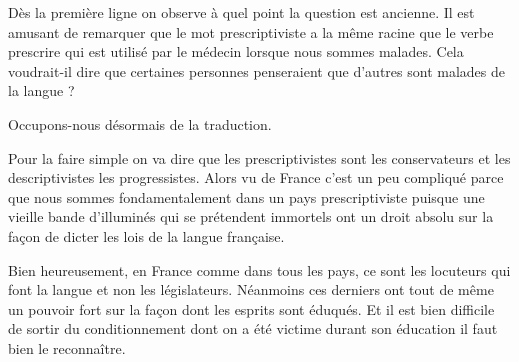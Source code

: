 Dès la première ligne on observe à quel point la question est
ancienne. Il est amusant de remarquer que le mot prescriptiviste a la
même racine que le verbe prescrire qui est utilisé par le médecin
lorsque nous sommes malades. Cela voudrait-il dire que certaines
personnes penseraient que d'autres sont malades de la langue ?

Occupons-nous désormais de la traduction.

\begin{center}
\begin{mdframed}[style=tradstyle, frametitle={\exFR{Traduction} d'un extrait du livre \bs}]
\end{mdframed}  
\end{center}


Pour la faire simple on va dire que les prescriptivistes sont les
conservateurs et les descriptivistes les progressistes. Alors vu de
France c'est un peu compliqué parce que nous sommes fondamentalement
dans un pays prescriptiviste puisque une vieille bande d'illuminés
qui se prétendent immortels ont un droit absolu sur la façon de dicter
les lois de la langue française.

Bien heureusement, en France comme dans tous les pays, ce sont les
locuteurs qui font la langue et non les législateurs. Néanmoins ces
derniers ont tout de même un pouvoir fort sur la façon dont les
esprits sont éduqués. Et il est bien difficile de sortir du
conditionnement dont on a été victime durant son éducation il faut
bien le reconnaître.

